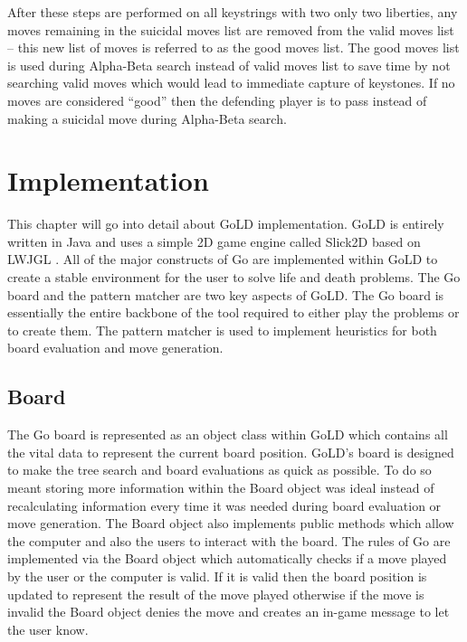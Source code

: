 \documentclass{l4proj}
\begin{document}
After these steps are performed on all keystrings with two only two liberties, any moves remaining in the suicidal moves list are removed from the valid moves list – this new list of moves is referred to as the good moves list. The good moves list is used during Alpha-Beta search instead of valid moves list to save time by not searching valid moves which would lead to immediate capture of keystones. If no moves are considered “good” then the defending player is to pass instead of making a suicidal move during Alpha-Beta search.














\chapter{Implementation}
This chapter will go into detail about GoLD implementation. GoLD is entirely written in Java and uses a simple 2D game engine called Slick2D \cite{SLICK2D} based on LWJGL \cite{LWJGL}. All of the major constructs of Go are implemented within GoLD to create a stable environment for the user to solve life and death problems.  The Go board and the pattern matcher are two key aspects of GoLD. The Go board is essentially the entire backbone of the tool required to either play the problems or to create them. The pattern matcher is used to implement heuristics for both board evaluation and move generation.

\section{Board}

The Go board is represented as an object class within GoLD which contains all the vital data to represent the current board position. GoLD's board is designed to make the tree search and board evaluations as quick as possible. To do so meant storing more information within the Board object was ideal instead of recalculating information every time it was needed during board evaluation or move generation. The Board object also implements public methods which allow the computer and also the users to interact with the board. The rules of Go are implemented via the Board object which automatically checks if a move played by the user or the computer is valid. If it is valid then the board position is updated to represent the result of the move played otherwise if the move is invalid the Board object denies the move and creates an in-game message to let the user know.
\end{document}
